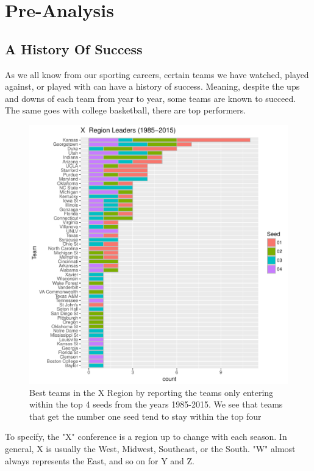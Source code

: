 \documentclass[]{scrartcl}
\begin{document}
\section*{Pre-Analysis}
\subsection*{A History Of Success}
As we all know from our sporting careers, certain teams we have watched, played against, or played with can have a history of success. Meaning, despite the ups and downs of each team from year to year, some teams are known to succeed. The same goes with college basketball, there are top performers.
\begin{figure}[H]
	\centering
	\includegraphics[]{455Project/XConfLeader.pdf}
	\caption[leaders]{Best teams in the X Region by reporting the teams only entering within the top 4 seeds from the years 1985-2015. We see that teams that get the number one seed tend to stay within the top four }
	\label{rVals}
\end{figure}
To specify, the "X" conference is a region up to change with each season. In general, X is usually the West, Midwest, Southeast, or the South. "W" almost always represents the East, and so on for Y and Z. 
\end{document}
